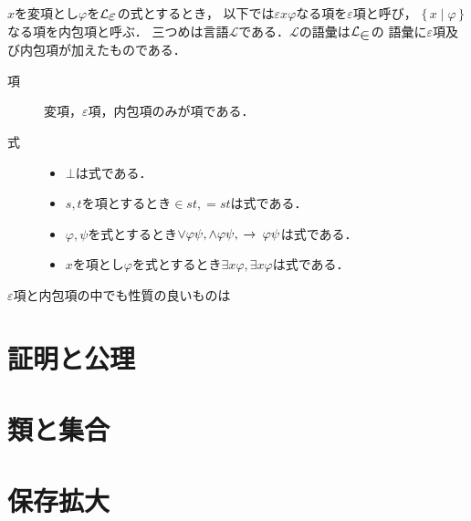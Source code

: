 \documentclass[twocolumn,10pt]{jarticle}
\theoremstyle{mystyle}
\newcommand{\lang}[1]{\mathcal{L}_{\scalebox{1.2}{$#1$}}} %
\newcommand{\Set}[2]{\{\, #1 \mid #2\, \}} %
\newcommand{\rarrow}{\hspace{0.25em}\rightarrow\hspace{0.25em}} %
\begin{document}
	$x$を変項とし$\varphi$を$\lang{\varepsilon}$の式とするとき，
	以下では$\varepsilon x \varphi$なる項を$\varepsilon$項と呼び，
	$\Set{x}{\varphi}$なる項を内包項と呼ぶ．
	三つめは言語$\mathcal{L}$である．$\mathcal{L}$の語彙は$\lang{\in}$の
	語彙に$\varepsilon$項及び内包項が加えたものである．
	
	\begin{description}
		\item[項] 変項，$\varepsilon$項，内包項のみが項である．
		\item[式] 
			\begin{itemize}
				\item $\bot$は式である．
				\item $s,t$を項とするとき$\in st, =st$は式である．
				\item $\varphi,\psi$を式とするとき$\vee \varphi\psi,\wedge \varphi \psi,\rarrow \varphi \psi$は式である．
				\item $x$を項とし$\varphi$を式とするとき$\exists x \varphi,\exists x \varphi$は式である．
			\end{itemize}
	\end{description}
	
	$\varepsilon$項と内包項の中でも性質の良いものは
	
\section{証明と公理}
\section{類と集合}
\section{保存拡大}
\end{document}
